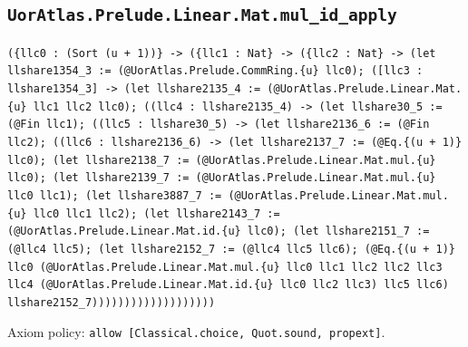 \documentclass[11pt]{article}
\begin{document}
\subsection*{\texttt{UorAtlas.Prelude.Linear.Mat.mul\_id\_apply}}
\noindent\texttt{(\{llc0 : (Sort (u + 1))\} -> (\{llc1 : Nat\} -> (\{llc2 : Nat\} -> (let llshare1354\_3 := (@UorAtlas.Prelude.CommRing.\{u\} llc0); ([llc3 : llshare1354\_3] -> (let llshare2135\_4 := (@UorAtlas.Prelude.Linear.Mat.\{u\} llc1 llc2 llc0); ((llc4 : llshare2135\_4) -> (let llshare30\_5 := (@Fin llc1); ((llc5 : llshare30\_5) -> (let llshare2136\_6 := (@Fin llc2); ((llc6 : llshare2136\_6) -> (let llshare2137\_7 := (@Eq.\{(u + 1)\} llc0); (let llshare2138\_7 := (@UorAtlas.Prelude.Linear.Mat.mul.\{u\} llc0); (let llshare2139\_7 := (@UorAtlas.Prelude.Linear.Mat.mul.\{u\} llc0 llc1); (let llshare3887\_7 := (@UorAtlas.Prelude.Linear.Mat.mul.\{u\} llc0 llc1 llc2); (let llshare2143\_7 := (@UorAtlas.Prelude.Linear.Mat.id.\{u\} llc0); (let llshare2151\_7 := (@llc4 llc5); (let llshare2152\_7 := (@llc4 llc5 llc6); (@Eq.\{(u + 1)\} llc0 (@UorAtlas.Prelude.Linear.Mat.mul.\{u\} llc0 llc1 llc2 llc2 llc3 llc4 (@UorAtlas.Prelude.Linear.Mat.id.\{u\} llc0 llc2 llc3) llc5 llc6) llshare2152\_7)))))))))))))))))))}\par
\noindent Axiom policy: \texttt{allow [Classical.choice, Quot.sound, propext]}.\par
\end{document}
